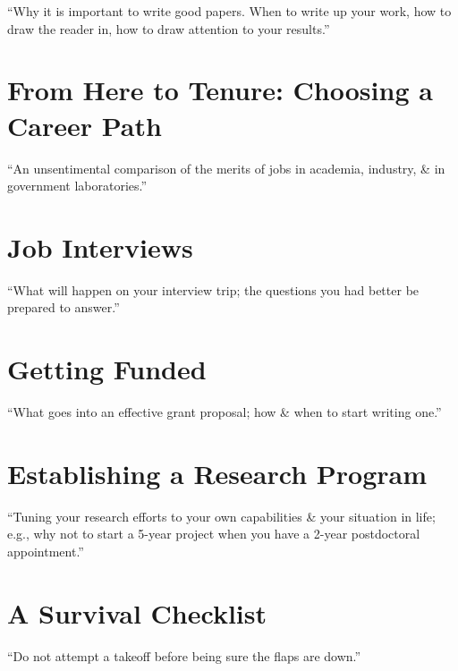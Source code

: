 \documentclass[oneside]{book}
\numberwithin{equation}{section}
\begin{document}
\begin{flushright}
	``Why it is important to write good papers. When to write up your work, how to draw the reader in, how to draw attention to your results.''
\end{flushright}

\section{From Here to Tenure: Choosing a Career Path}

\begin{flushright}
	``An unsentimental comparison of the merits of jobs in academia, industry, \& in government laboratories.''
\end{flushright}

\section{Job Interviews}

\begin{flushright}
	``What will happen on your interview trip; the questions you had better be prepared to answer.''
\end{flushright}

\section{Getting Funded}

\begin{flushright}
	``What goes into an effective grant proposal; how \& when to start writing one.''
\end{flushright}

\section{Establishing a Research Program}

\begin{flushright}
	``Tuning your research efforts to your own capabilities \& your situation in life; e.g., why not to start a 5-year project when you have a 2-year postdoctoral appointment.''
\end{flushright}

\section{A Survival Checklist}

\begin{flushright}
	``Do not attempt a takeoff before being sure the flaps are down.''
\end{flushright}
\end{document}
